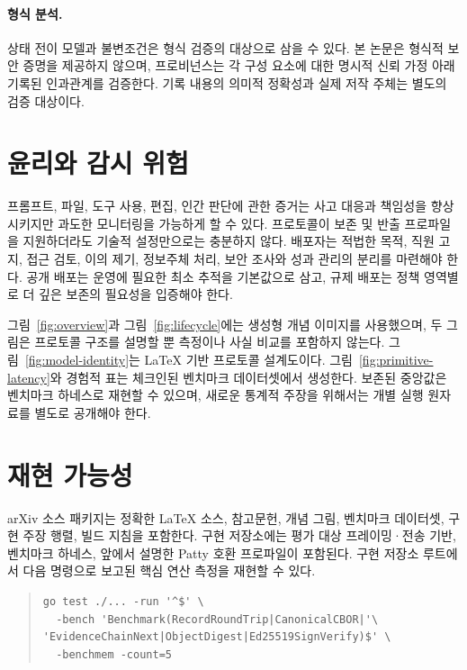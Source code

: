 \documentclass[10pt]{article}
\begin{document}
\paragraph{형식 분석.}
상태 전이 모델과 불변조건은 형식 검증의 대상으로 삼을 수 있다. 본 논문은 형식적 보안 증명을 제공하지 않으며, 프로비넌스는 각 구성 요소에 대한 명시적 신뢰 가정 아래 기록된 인과관계를 검증한다. 기록 내용의 의미적 정확성과 실제 저작 주체는 별도의 검증 대상이다.

\section{윤리와 감시 위험}

프롬프트, 파일, 도구 사용, 편집, 인간 판단에 관한 증거는 사고 대응과 책임성을 향상시키지만 과도한 모니터링을 가능하게 할 수 있다. 프로토콜이 보존 및 반출 프로파일을 지원하더라도 기술적 설정만으로는 충분하지 않다. 배포자는 적법한 목적, 직원 고지, 접근 검토, 이의 제기, 정보주체 처리, 보안 조사와 성과 관리의 분리를 마련해야 한다. 공개 배포는 운영에 필요한 최소 추적을 기본값으로 삼고, 규제 배포는 정책 영역별로 더 깊은 보존의 필요성을 입증해야 한다.

그림~\ref{fig:overview}과 그림~\ref{fig:lifecycle}에는 생성형 개념 이미지를 사용했으며, 두 그림은 프로토콜 구조를 설명할 뿐 측정이나 사실 비교를 포함하지 않는다. 그림~\ref{fig:model-identity}는 LaTeX 기반 프로토콜 설계도이다. 그림~\ref{fig:primitive-latency}와 경험적 표는 체크인된 벤치마크 데이터셋에서 생성한다. 보존된 중앙값은 벤치마크 하네스로 재현할 수 있으며, 새로운 통계적 주장을 위해서는 개별 실행 원자료를 별도로 공개해야 한다.

\section{재현 가능성}

arXiv 소스 패키지는 정확한 LaTeX 소스, 참고문헌, 개념 그림, 벤치마크 데이터셋, 구현 주장 행렬, 빌드 지침을 포함한다. 구현 저장소에는 평가 대상 프레이밍·전송 기반, 벤치마크 하네스, 앞에서 설명한 Patty 호환 프로파일이 포함된다. 구현 저장소 루트에서 다음 명령으로 보고된 핵심 연산 측정을 재현할 수 있다.

\begin{quote}\small
\begin{verbatim}
go test ./... -run '^$' \
  -bench 'Benchmark(RecordRoundTrip|CanonicalCBOR|'\
'EvidenceChainNext|ObjectDigest|Ed25519SignVerify)$' \
  -benchmem -count=5
\end{verbatim}
\end{quote}
\end{document}
